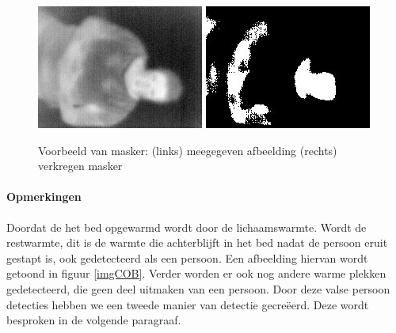 \begin{figure}[hbp]
	\includegraphics[scale=0.75]{EersteExperiment_img0}
	\includegraphics[scale = 0.75]{EersteExperiment_mask0}
	\caption{Voorbeeld van masker: (links) meegegeven afbeelding (rechts) verkregen masker}
	\label{imgCMa}
\end{figure}
\paragraph{Opmerkingen}
Doordat de het bed opgewarmd wordt door de lichaamswarmte. Wordt de restwarmte, dit is de warmte die achterblijft in het bed nadat de persoon eruit gestapt is, ook gedetecteerd als een persoon. Een afbeelding hiervan wordt getoond in figuur \ref{imgCOB}. Verder worden er ook nog andere warme plekken gedetecteerd, die geen deel uitmaken van een persoon. Door deze valse persoon detecties hebben we een tweede manier van detectie gecre\"eerd. Deze wordt besproken in de volgende paragraaf.

